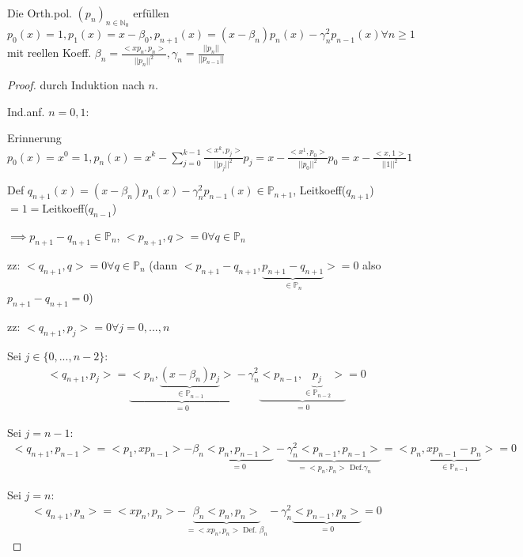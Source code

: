 \begin{lemma}
	Die Orth.pol. $(p_n)_{n \in \mathbb{N}_0}$ erfüllen $p_0(x) = 1, p_1(x) = x-\beta_0, p_{n+1}(x) = (x-\beta_n) p_n(x) - \gamma_n^2 p_{n-1}(x) \forall n \geq 1$ mit reellen Koeff. $\beta_n = \frac{<xp_n, p_n>}{||p_n||^2}, \gamma_n = \frac{||p_n||}{||p_{n-1}||}$
\end{lemma}

\begin{proof}
	durch Induktion nach $n$.
	
	Ind.anf. $n=0,1$:
	
	Erinnerung $p_0(x) = x^0 = 1, p_n(x) = x^k - \sum_{j=0}^{k-1} \frac{<x^k, p_j>}{||p_j||^2} p_j = x - \frac{<x^1, p_0>}{||p_0||^2} p_0 = x - \frac{<x, 1>}{||1||^2} 1$
	
	Def $q_{n+1}(x) = (x- \beta_n) p_n(x) - \gamma_n^2 p_{n-1}(x) \in \mathbb{P}_{n+1}$, Leitkoeff($q_{n+1}$)$=1=$Leitkoeff($q_{n-1}$)
	
	$\implies p_{n+1} - q_{n+1} \in \mathbb{P}_n$, $<p_{n+1}, q> = 0 \forall q \in \mathbb{P}_n$
	
	zz: $<q_{n+1}, q> = 0 \forall q \in \mathbb{P}_n$ (dann $<p_{n+1} - q_{n+1}, \underbrace{p_{n+1} - q_{n+1}}_{\in \mathbb{P}_n}> = 0$ also $p_{n+1} - q_{n+1} = 0$)
	
	zz: $<q_{n+1}, p_j> = 0 \forall j=0, ..., n$
	
	Sei $j \in \{0, ..., n-2\}$:
	\begin{align*}
		<q_{n+1}, p_j> = \underbrace{<p_n, \underbrace{(x - \beta_n) p_j}_{\in \mathbb{P}_{n-1}}>}_{=0} - \gamma_n^2 \underbrace{<p_{n-1}, \underbrace{p_j}_{\in \mathbb{P}_{n-2}}>}_{=0} = 0
	\end{align*}
	
	Sei $j = n-1:$
	\begin{align*}
		<q_{n+1}, p_{n-1}> = <p_1, xp_{n-1}> - \beta_n \underbrace{<p_n, p_{n-1}>}_{=0} - \underbrace{\gamma_n^2 <p_{n-1}, p_{n-1}>}_{=<p_n, p_n> \text{ Def.} \gamma_n} = <p_n, \underbrace{xp_{n-1} - p_n}_{\in \mathbb{P}_{n-1}}> = 0
	\end{align*}
	
	Sei $j=n$:
	\begin{align*}
		<q_{n+1}, p_n> = <xp_n, p_n> - \underbrace{\beta_n <p_n, p_n>}_{=<xp_n, p_n> \text{ Def. } \beta_n} - \gamma_n^2 \underbrace{<p_{n-1}, p_n>}_{=0} = 0
	\end{align*}
\end{proof}


